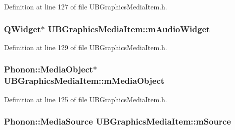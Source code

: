 Definition at line 127 of file U\-B\-Graphics\-Media\-Item.\-h.

\hypertarget{class_u_b_graphics_media_item_aedab2a57e159cbc15e470614b0ef2f2c}{
\subsubsection[{m\-Audio\-Widget}]{\setlength{\rightskip}{0pt plus 5cm}Q\-Widget$\ast$ U\-B\-Graphics\-Media\-Item\-::m\-Audio\-Widget\hspace{0.3cm}{\ttfamily [protected]}}}\label{dc/d5a/class_u_b_graphics_media_item_aedab2a57e159cbc15e470614b0ef2f2c}


Definition at line 129 of file U\-B\-Graphics\-Media\-Item.\-h.

\hypertarget{class_u_b_graphics_media_item_a05333e3836a8f9e3dd9658ef5e2009f9}{
\subsubsection[{m\-Media\-Object}]{\setlength{\rightskip}{0pt plus 5cm}Phonon\-::\-Media\-Object$\ast$ U\-B\-Graphics\-Media\-Item\-::m\-Media\-Object\hspace{0.3cm}{\ttfamily [protected]}}}\label{dc/d5a/class_u_b_graphics_media_item_a05333e3836a8f9e3dd9658ef5e2009f9}


Definition at line 125 of file U\-B\-Graphics\-Media\-Item.\-h.

\hypertarget{class_u_b_graphics_media_item_a949d95040d1999f123f94c06c0e35ffd}{
\subsubsection[{m\-Source}]{\setlength{\rightskip}{0pt plus 5cm}Phonon\-::\-Media\-Source U\-B\-Graphics\-Media\-Item\-::m\-Source\hspace{0.3cm}{\ttfamily [protected]}}}\label{dc/d5a/class_u_b_graphics_media_item_a949d95040d1999f123f94c06c0e35ffd}


